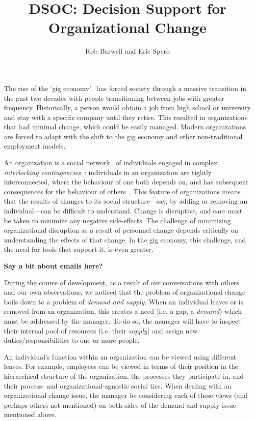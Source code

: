 \documentclass[journal]{vgtc}                %
\title{DSOC: Decision Support for Organizational Change}
\author{Rob Barwell and Eric Spero}
\begin{document}

\maketitle


The rise of the \lq gig economy\rq{}~\cite{de2015rise,friedman2014workers} has forced society through a massive transition in the past two decades with people transitioning between jobs with greater frequency.  Historically, a person would obtain a job from high school or university and stay with a specific company until they retire.  This resulted in organizations that had minimal change, which could be easily managed. Modern organizations are forced to adapt with the shift to the gig economy and other non-traditional employment models.  

An organization is a social network~\cite{scott1988social} of individuals engaged in complex \emph{interlocking contingencies}~\cite{glenn2006complexity}: individuals in an organization are tightly interconnected, where the behaviour of one both depends on, and has subsequent consequences for the behaviour of others~\cite{glenn2006complexity}. This feature of organizations means that the results of changes to its social structure---say, by adding or removing an individual---can be difficult to understand. Change is disruptive, and care must be taken to minimize any negative side-effects. The challenge of minimizing organizational disruption as a result of personnel change depends critically on understanding the effects of that change. In the gig economy, this challenge, and the need for tools that support it, is even greater. 

\textbf{{\color{Plum}Say a bit about emails here?}}

During the course of development, as a result of our conversations with others and our own observations, we noticed that the problem of organizational change boils down to a problem of \emph{demand and supply}. When an individual leaves or is removed from an organization, this creates a need (i.e. a gap, a \emph{demand}) which must be addressed by the manager. To do so, the manager will have to inspect their internal pool of resources (i.e. their \emph{supply}) and assign new duties/responsibilities to one or more people.

An individual's function within an organization can be viewed using different lenses. For example, employees can be viewed in terms of their position in the hierarchical structure of the organization, the processes they participate in, and their process- and organizational-agnostic social ties. When dealing with an organizational change issue, the manager be considering each of these views (and perhaps others not mentioned) on both sides of the demand and supply issue mentioned above.
\end{document}
